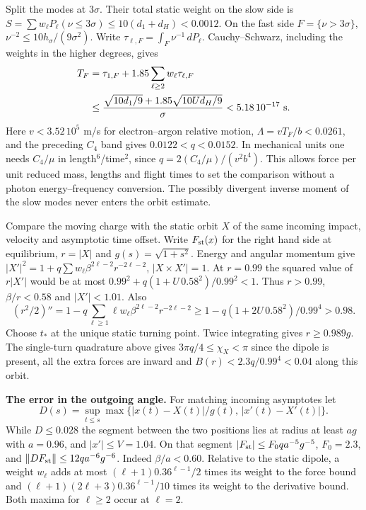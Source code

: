 \documentclass[11pt,a4paper]{article}
\begin{document}
Split the modes at \(3\sigma\). Their total static weight on the slow
side is \(S=\sum w_\ell P_\ell(\nu\le3\sigma)\le10(d_1+d_H)<0.0012\). On
the fast side \(F=\{\nu>3\sigma\}\), \(\nu^{-2}\le
10h_\sigma/(9\sigma^2)\). Write
\(\tau_{\ell,F}=\int_F\nu^{-1}\,dP_\ell\). Cauchy--Schwarz, including
the weights in the higher degrees, gives \[
 \begin{aligned}
 T_F&=\tau_{1,F}+1.85\sum_{\ell\ge2}w_\ell\tau_{\ell,F}\\
 &\le\frac{\sqrt{10d_1/9}+1.85\sqrt{10U d_H/9}}{\sigma}
 <5.18\,10^{-17}\ {\rm s}.
 \end{aligned}
\] Here \(v<3.52\,10^5\) m/s for electron--argon relative motion,
\(\Lambda=vT_F/b<0.0261\), and the preceding \(C_4\) band gives
\(0.0122<q<0.0152\). In mechanical units one needs \(C_4/\mu\) in
length\(^6\)/time\(^2\), since \(q=2(C_4/\mu)/(v^2b^4)\). This allows
force per unit reduced mass, lengths and flight times to set the
comparison without a photon energy--frequency conversion. The possibly
divergent inverse moment of the slow modes never enters the orbit
estimate.

Compare the moving charge with the static orbit \(X\) of the same
incoming impact, velocity and asymptotic time offset. Write
\(F_{\rm st}(x)\) for the right hand side at equilibrium, \(r=|X|\) and
\(g(s)=\sqrt{1+s^2}\). Energy and angular momentum give
\(|X'|^2=1+q\sum w_\ell\beta^{2\ell-2}r^{-2\ell-2}\),
\(|X\times X'|=1\). At \(r=0.99\) the squared value of \(r|X'|\) would
be at most \(0.99^2+q(1+U\,0.58^2)/0.99^2<1\). Thus \(r>0.99\),
\(\beta/r<0.58\) and \(|X'|<1.01\). Also \[
 (r^2/2)''=1-q\sum_{\ell\ge1}\ell w_\ell\beta^{2\ell-2}r^{-2\ell-2}
 \ge 1-q(1+2U\,0.58^2)/0.99^4>0.98 .
\] Choose \(t_*\) at the unique static turning point. Twice integrating
gives \(r\ge0.989g\). The single-turn quadrature above gives
\(3\pi q/4\le\chi_X<\pi\) since the dipole is present, all the extra
forces are inward and \(B(r)<2.3q/0.99^4<0.04\) along this orbit.

\textbf{The error in the outgoing angle.} For matching incoming
asymptotes let \[
 D(s)=\sup_{t\le s}\max\bigl\{|x(t)-X(t)|/g(t),\,|x'(t)-X'(t)|\bigr\}.
\] While \(D\le0.028\) the segment between the two positions lies at
radius at least \(a g\) with \(a=0.96\), and \(|x'|\le V=1.04\). On that
segment \(|F_{\rm st}|\le F_0 q a^{-5}g^{-5}\), \(F_0=2.3\), and
\(\|DF_{\rm st}\|\le12q a^{-6}g^{-6}\). Indeed \(\beta/a<0.60\).
Relative to the static dipole, a weight \(w_\ell\) adds at most
\((\ell+1)0.36^{\ell-1}/2\) times its weight to the force bound and
\((\ell+1)(2\ell+3)0.36^{\ell-1}/10\) times its weight to the derivative
bound. Both maxima for \(\ell\ge2\) occur at \(\ell=2\).
\end{document}
